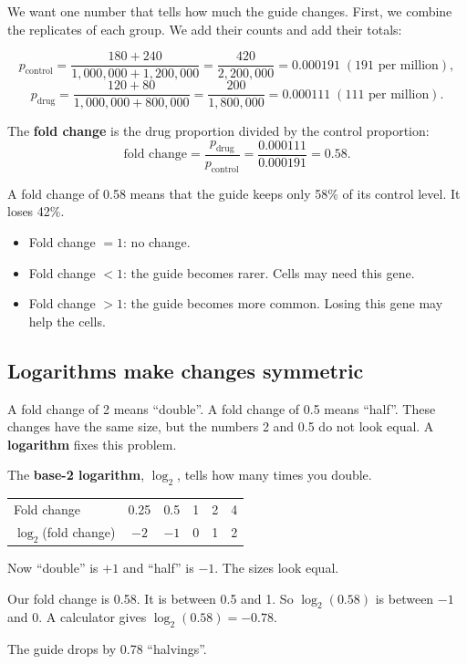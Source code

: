 \documentclass[12pt]{article}
\begin{document}
We want one number that tells how much the guide changes. First, we combine
the replicates of each group. We add their counts and add their totals:

\[
p_{\text{control}} = \frac{180+240}{1{,}000{,}000+1{,}200{,}000}
 = \frac{420}{2{,}200{,}000} = 0.000191 \;(191 \text{ per million}),
\]
\[
p_{\text{drug}} = \frac{120+80}{1{,}000{,}000+800{,}000}
 = \frac{200}{1{,}800{,}000} = 0.000111 \;(111 \text{ per million}).
\]

The \textbf{fold change} is the drug proportion divided by the control
proportion:
\[
\text{fold change} = \frac{p_{\text{drug}}}{p_{\text{control}}}
 = \frac{0.000111}{0.000191} = 0.58.
\]

A fold change of 0.58 means that the guide keeps only 58\% of its control
level. It loses 42\%.

\begin{remember}
\begin{itemize}[leftmargin=1.2em]
\item Fold change $= 1$: no change.
\item Fold change $< 1$: the guide becomes rarer. Cells may need this gene.
\item Fold change $> 1$: the guide becomes more common. Losing this gene
  may help the cells.
\end{itemize}
\end{remember}

\subsection{Logarithms make changes symmetric}

A fold change of 2 means ``double''. A fold change of 0.5 means ``half''.
These changes have the same size, but the numbers 2 and 0.5 do not look
equal. A \textbf{logarithm} fixes this problem.

The \textbf{base-2 logarithm}, $\log_2$, tells how many times you double.
\begin{center}
\begin{tabular}{lccccc}
\toprule
Fold change & 0.25 & 0.5 & 1 & 2 & 4\\
$\log_2$(fold change) & $-2$ & $-1$ & 0 & 1 & 2\\
\bottomrule
\end{tabular}
\end{center}
Now ``double'' is $+1$ and ``half'' is $-1$. The sizes look equal.

\begin{worked}
Our fold change is 0.58. It is between 0.5 and 1. So $\log_2(0.58)$ is
between $-1$ and 0. A calculator gives $\log_2(0.58) = -0.78$.

The guide drops by 0.78 ``halvings''.
\end{worked}
\end{document}
